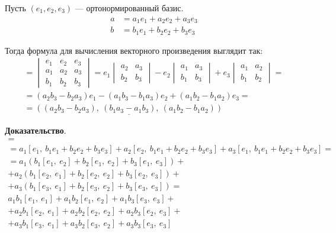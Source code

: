 \documentclass[a4paper, 12pt]{article}
\begin{document}
\vspace{5mm}
Пусть $(e_1, e_2, e_3)$ --- ортонормированный базис.
\vspace{-2mm}
\begin{align*}
a &= a_1e_1 + a_2e_2 + a_3e_3 \\
b &= b_1e_1 + b_2e_2 + b_3e_3
\end{align*}

\vspace{-2mm}
Тогда формула для вычисления векторного произведения выглядит так:
\vspace{-2mm}
\begin{align*}
[a,\ b] =
\begin{vmatrix}
e_1 & e_2 & e_3 \\
a_1 & a_2 & a_3 \\
b_1 & b_2 & b_3
\end{vmatrix} =
e_1
\begin{vmatrix}
a_2 & a_3 \\
b_2 & b_3
\end{vmatrix}
- e_2
\begin{vmatrix}
a_1 & a_3 \\
b_1 & b_3
\end{vmatrix}
+ e_3
\begin{vmatrix}
a_1 & a_2 \\
b_1 & b_2
\end{vmatrix} = \\
= (a_2b_3 - b_2a_3)e_1 - (a_1b_3 - b_1a_3)e_2 + (a_1b_2 - b_1a_2)e_3 = \\
= \underline{((a_2b_3 - b_2a_3),\ (b_1a_3 - a_1b_3),\ (a_1b_2 - b_1a_2))}
\end{align*}

\textbf{Доказательство}.
\vspace{-3mm}
\begin{gather*}
[a_1e_1 + a_2e_2 + a_3e_3,\ b_1e_1 + b_2e_2 + b_3e_3] = \\
= a_1[e_1,\ b_1e_1 + b_2e_2 + b_3e_3] + a_2[e_2,\ b_1e_1 + b_2e_2 + b_3e_3] + a_3[e_1,\ b_1e_1 + b_2e_2 + b_3e_3] = \\
= a_1(b_1[e_1,\ e_2] + b_2[e_1,\ e_2] + b_3[e_1,\ e_3]) + \\
+ a_2(b_1[e_2,\ e_1] + b_2[e_2,\ e_2] + b_3[e_2,\ e_3]) + \\
+ a_3(b_1[e_3,\ e_1] + b_2[e_3,\ e_2] + b_3[e_3,\ e_3]) = \\
a_1b_1[e_1,\ e_1] + a_1b_2[e_1,\ e_2] + a_1b_3[e_3,\ e_3] + \\ + a_2b_1[e_2,\ e_1] + a_2b_2[e_2,\ e_2] + a_2b_3[e_2,\ e_3] + \\ + a_3b_1[e_3,\ e_1] + a_3b_2[e_3,\ e_2] + a_3b_3[e_3,\ e_3]
\end{gather*}
\end{document}
